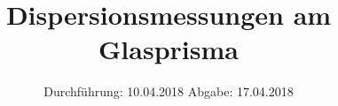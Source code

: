 

\subject{VERSUCH 402}
\title{Dispersionsmessungen am Glasprisma}
\date{%
  Durchführung: 10.04.2018
  \hspace{3em}
  Abgabe: 17.04.2018
}



\maketitle
\thispagestyle{empty}
\tableofcontents
\newpage







\printbibliography{}


